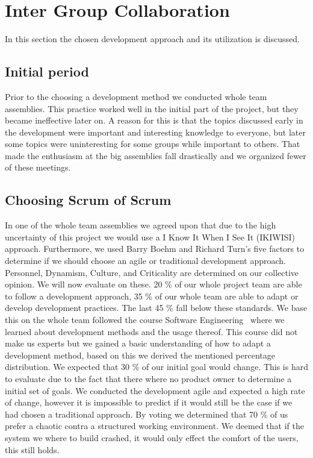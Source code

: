 \section{Inter Group Collaboration}
\label{sec:intergroup}
In this section the chosen development approach and its utilization is discussed. 

\subsection{Initial period}
Prior to the choosing a development method we conducted whole team assemblies. 
This practice worked well in the initial part of the project, but they became ineffective later on. 
A reason for this is that the topics discussed early in the development were important and interesting knowledge to everyone, but later some topics were uninteresting for some groups while important to others.
That made the enthusiasm at the big assemblies fall drastically and we organized fewer of these meetings.


\subsection{Choosing Scrum of Scrum}
In one of the whole team assemblies we agreed upon that due to the high uncertainty of this project we would use a I Know It When I See It (IKIWISI) approach. 
Furthermore, we used Barry Boehm and Richard Turn's five factors to determine if we should choose an agile or traditional development approach. 
Personnel, Dynamism, Culture, and Criticality are determined on our collective opinion. 
We will now evaluate on these.    
20 \% of our whole project team are able to follow a development approach, 35 \% of our whole team are able to adapt or develop development practices. 
The last 45 \% fall below these standards.
We base this on the whole team followed the course Software Engineering~\cite[S. 4.4.2]{sw6studieordning} where we learned about development methods and the usage thereof. 
This course did not make us experts but we gained a basic understanding of how to adapt a development method, based on this we derived the mentioned percentage distribution.  
We expected that 30 \% of our initial goal would change.
This is hard to evaluate due to the fact that there where no product owner to determine a initial set of goals.
We conducted the development agile and expected a high rate of change, however it is impossible to predict if it would still be the case if we had chosen a traditional approach.  
By voting we determined that 70 \% of us prefer a chaotic contra a structured working environment.
We deemed that if the system we where to build crashed, it would only effect the comfort of the users, this still holds.

